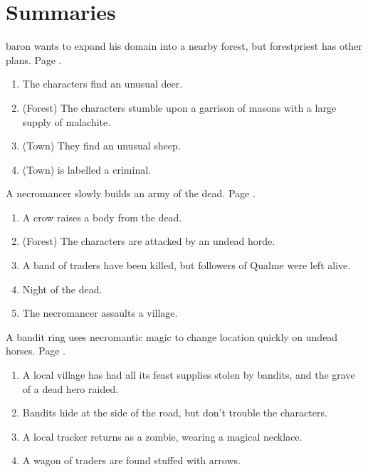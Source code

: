 \setcounter{encnum}{1}


\section{Summaries}


\gls{baron} wants to expand his domain into a nearby forest, but \gls{forestpriest} has other plans.
Page \pageref{herenofarther}.

\begin{enumerate}
	\item{The characters find an unusual deer.}
	\item{(Forest) The characters stumble upon a garrison of masons with a large supply of malachite.}
	\item{(Town) They find an unusual sheep.}
	\item{(Town)  is labelled a criminal.}
\end{enumerate}

A necromancer slowly builds an army of the dead.
Page \pageref{necromancerspet}.

\begin{enumerate}
	\item{A crow raises a body from the dead.}
	\item{(Forest) The characters are attacked by an undead horde.}
	\item{A band of traders have been killed, but followers of Qualme were left alive.}
	\item{Night of the dead.}
	\item{ The necromancer assaults a village.}
\end{enumerate}

A bandit ring uses necromantic magic to change location quickly on undead horses.
Page \pageref{immortalbandits}.

\begin{enumerate}

	\item{A local village has had all its feast supplies stolen by bandits, and the grave of a dead hero raided.}
	\item{Bandits hide at the side of the road, but don't trouble the characters.}
	\item{A local tracker returns as a zombie, wearing a magical necklace.}
	\item{A wagon of traders are found stuffed with arrows.}
\end{enumerate}

